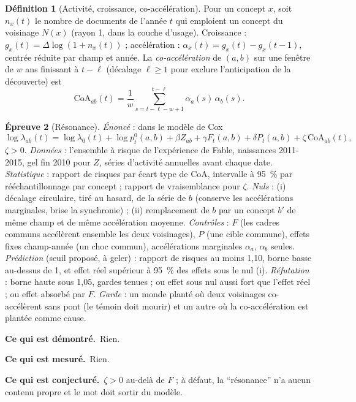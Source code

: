 \documentclass[11pt,a4paper]{article}
\theoremstyle{definition}
\newtheorem{definition}{Définition}[section]
\newtheorem{test}[definition]{Épreuve}
\theoremstyle{plain}
\newcommand{\demontre}{\par\noindent\textbf{Ce qui est démontré.}~}
\newcommand{\mesure}{\par\smallskip\noindent\textbf{Ce qui est mesuré.}~}
\newcommand{\conjecture}{\par\smallskip\noindent\textbf{Ce qui est conjecturé.}~}
\begin{document}
\begin{definition}[Activité, croissance, co-accélération]
\label{def:coacc}
Pour un concept $x$, soit $n_x(t)$ le nombre de documents de l'année $t$ qui emploient un concept du
voisinage $N(x)$ (rayon 1, dans la couche d'usage). Croissance : $g_x(t)=\Delta\log(1+n_x(t))$ ;
accélération : $\alpha_x(t)=g_x(t)-g_x(t-1)$, centrée réduite par champ et année. La
\emph{co-accélération} de $(a,b)$ sur une fenêtre de $w$ ans finissant à $t-\ell$ (décalage $\ell\ge1$
pour exclure l'anticipation de la découverte) est
\[ \mathrm{CoA}_{ab}(t)=\frac1w\sum_{s=t-\ell-w+1}^{t-\ell}\alpha_a(s)\,\alpha_b(s). \]
\end{definition}

\begin{test}[Résonance]
\label{test:resonance}
\emph{Énoncé} : dans le modèle de Cox
\[ \log\lambda_{ab}(t)=\log\lambda_0(t)+\log p^0_t(a,b)+\beta Z_{ab}+\gamma F_t(a,b)+\delta P_t(a,b)+\zeta\,\mathrm{CoA}_{ab}(t), \]
$\zeta>0$. \emph{Données} : l'ensemble à risque de l'expérience de Fable, naissances 2011-2015, gel
fin 2010 pour $Z$, séries d'activité annuelles avant chaque date. \emph{Statistique} : rapport de
risques par écart type de $\mathrm{CoA}$, intervalle à 95~\% par rééchantillonnage par concept ;
rapport de vraisemblance pour $\zeta$. \emph{Nuls} : (i) décalage circulaire, tiré au hasard, de la
série de $b$ (conserve les accélérations marginales, brise la synchronie) ; (ii) remplacement de
$b$ par un concept $b'$ de même champ et de même accélération moyenne. \emph{Contrôles} : $F$ (les
cadres communs accélèrent ensemble les deux voisinages), $P$ (une cible commune), effets fixes
champ-année (un choc commun), accélérations marginales $\alpha_a$, $\alpha_b$ seules.
\emph{Prédiction} (seuil proposé, à geler) : rapport de risques au moins 1,10, borne basse au-dessus
de 1, et effet réel supérieur à 95~\% des effets sous le nul (i). \emph{Réfutation} : borne haute sous
1,05, gardes tenues ; ou effet sous nul aussi fort que l'effet réel ; ou effet absorbé par $F$.
\emph{Garde} : un monde planté où deux voisinages co-accélèrent sans pont (le témoin doit mourir) et
un autre où la co-accélération est plantée comme cause.
\end{test}

\begin{statuts}
\demontre Rien.
\mesure Rien.
\conjecture $\zeta>0$ au-delà de $F$ ; à défaut, la \enquote{résonance} n'a aucun contenu propre et
le mot doit sortir du modèle.
\end{statuts}
\end{document}
